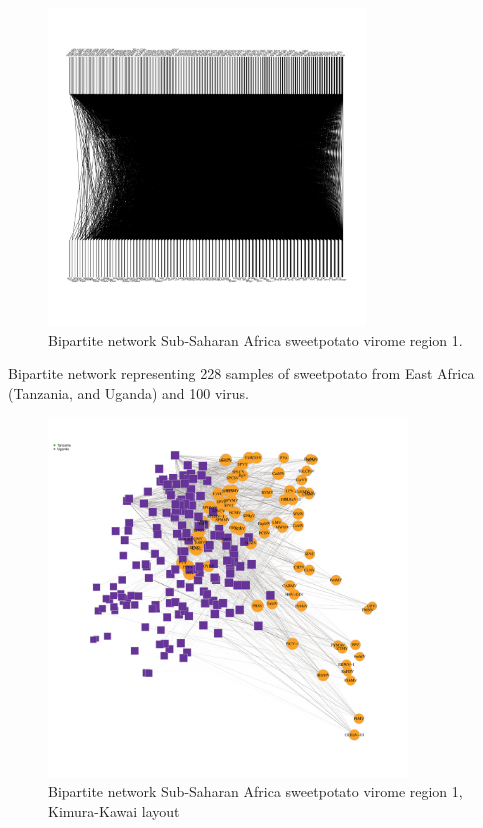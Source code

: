 \documentclass{article}
\begin{document}
\begin{figure}[h!]
\begin{center}
\includegraphics[width=0.75\textwidth]{../results/k-cluster1/1-kcluster_bipartitenetwork_Feb28.pdf} %
\caption{Bipartite network Sub-Saharan Africa sweetpotato virome region 1.}
\end{center}
\end{figure}

Bipartite network representing 228 samples of sweetpotato from East Africa (Tanzania, and Uganda) and 100 virus.


\begin{figure}[h!]
\begin{center}
\includegraphics[width=0.85\textwidth]{../results/k-cluster1/1-kcluster_bipartitenetwork-kk_Feb28.pdf
} %
\caption{Bipartite network Sub-Saharan Africa sweetpotato virome region 1, Kimura-Kawai layout}
\end{center}
\end{figure}
\end{document}
